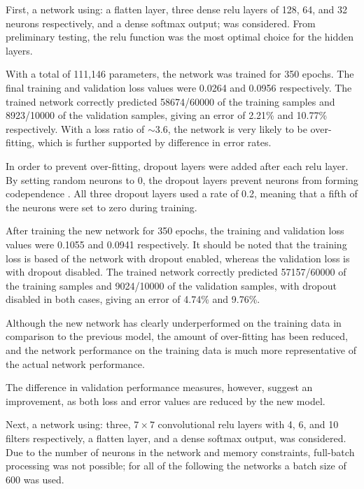 First, a network using: a flatten layer, three dense relu layers of 128, 64, and
32 neurons respectively, and a dense softmax output; was considered.
From preliminary testing, the relu function was the most optimal choice for the
hidden layers.

With a total of 111,146 parameters, the network was trained for 350 epochs.
The final training and validation loss values were 0.0264 and 0.0956
respectively.
The trained network correctly predicted 58674/60000 of the training samples and
8923/10000 of the validation samples, giving an error of 2.21\% and 10.77\%
respectively.
With a loss ratio of $\sim3.6$, the network is very likely to be over-fitting,
which is further supported by difference in error rates.

In order to prevent over-fitting, dropout layers were added after each relu
layer.
By setting random neurons to 0, the dropout layers prevent neurons from forming
codependence \citep{Hinton:2012:Dropout}.
All three dropout layers used a rate of 0.2, meaning that a fifth of the neurons
were set to zero during training.

After training the new network for 350 epochs, the training and validation loss
values were 0.1055 and 0.0941 respectively.
It should be noted that the training loss is based of the network with dropout
enabled, whereas the validation loss is with dropout disabled.
The trained network correctly predicted 57157/60000 of the training samples and
9024/10000 of the validation samples, with dropout disabled in both cases,
giving an error of 4.74\% and 9.76\%.

Although the new network has clearly underperformed on the training data in
comparison to the previous model, the amount of over-fitting has been reduced,
and the network performance on the training data is much more representative of
the actual network performance.

The difference in validation performance measures, however, suggest an
improvement, as both loss and error values are reduced by the new model.

Next, a network using: three, $7\times7$ convolutional relu layers with 4, 6,
and 10 filters respectively, a flatten layer, and a dense softmax output, was
considered.
Due to the number of neurons in the network and memory constraints, full-batch
processing was not possible; for all of the following the networks a batch size
of 600 was used.




